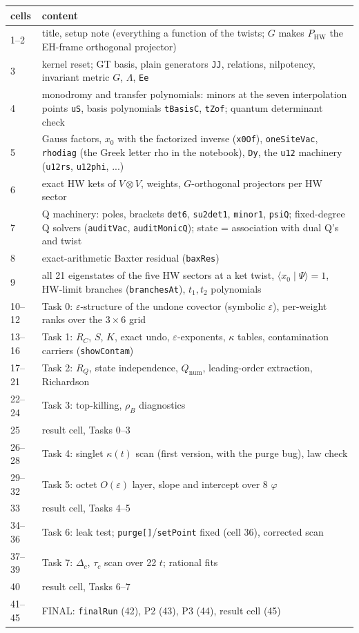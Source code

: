\documentclass[10pt]{article}
\newcommand{\nb}[1]{\texttt{#1}}
\begin{document}
\begin{center}\small\setlength{\tabcolsep}{3pt}\begin{longtable}{@{}lp{11.5cm}@{}}\toprule
\textbf{cells} & \textbf{content} \\\midrule\endhead
1--2 & title, setup note (everything a function of the twists; $G$ makes $P_{\mathrm{HW}}$ the EH-frame orthogonal projector) \\
3 & kernel reset; GT basis, plain generators \nb{JJ}, relations, nilpotency, invariant metric $G$, $\Lambda$, \nb{Ee} \\
4 & monodromy and transfer polynomials: minors at the seven interpolation points \nb{uS}, basis polynomials \nb{tBasisC}, \nb{tZof}; quantum determinant check \\
5 & Gauss factors, $x_0$ with the factorized inverse (\nb{x0Of}), \nb{oneSiteVac}, \nb{rhodiag} (the Greek letter rho in the notebook), \nb{Dy}, the \nb{u12} machinery (\nb{u12rs}, \nb{u12phi}, ...) \\
6 & exact HW kets of $V\otimes V$, weights, $G$-orthogonal projectors per HW sector \\
7 & Q machinery: poles, brackets \nb{det6}, \nb{su2det1}, \nb{minor1}, \nb{psiQ}; fixed-degree Q solvers (\nb{auditVac}, \nb{auditMonicQ}); state = association with dual Q's and twist \\
8 & exact-arithmetic Baxter residual (\nb{baxRes}) \\
9 & all 21 eigenstates of the five HW sectors at a ket twist, $\langle x_0\mid\Psi\rangle=1$, HW-limit branches (\nb{branchesAt}), $t_1,t_2$ polynomials \\
10--12 & Task 0: $\varepsilon$-structure of the undone covector (symbolic $\varepsilon$), per-weight ranks over the $3\times6$ grid \\
13--16 & Task 1: $R_C$, $S$, $K$, exact undo, $\varepsilon$-exponents, $\kappa$ tables, contamination carriers (\nb{showContam}) \\
17--21 & Task 2: $R_Q$, state independence, $Q_{\mathrm{num}}$, leading-order extraction, Richardson \\
22--24 & Task 3: top-killing, $\rho_B$ diagnostics \\
25 & result cell, Tasks 0--3 \\
26--28 & Task 4: singlet $\kappa(t)$ scan (first version, with the purge bug), law check \\
29--32 & Task 5: octet $O(\varepsilon)$ layer, slope and intercept over 8 $\varphi$ \\
33 & result cell, Tasks 4--5 \\
34--36 & Task 6: leak test; \nb{purge[]}/\nb{setPoint} fixed (cell 36), corrected scan \\
37--39 & Task 7: $\Delta_c$, $\tau_c$ scan over 22 $t$; rational fits \\
40 & result cell, Tasks 6--7 \\
41--45 & FINAL: \nb{finalRun} (42), P2 (43), P3 (44), result cell (45) \\
\bottomrule\end{longtable}\end{center}
\end{document}

